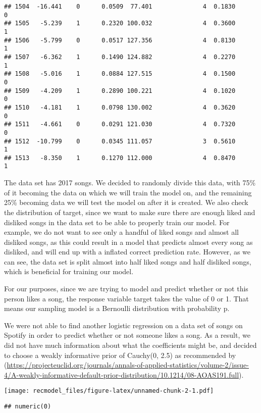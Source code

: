 \documentclass[
]{article}
\begin{document}
\begin{verbatim}
## 1504  -16.441    0      0.0509  77.401              4  0.1830      0
## 1505   -5.239    1      0.2320 100.032              4  0.3600      1
## 1506   -5.799    0      0.0517 127.356              4  0.8130      1
## 1507   -6.362    1      0.1490 124.882              4  0.2270      1
## 1508   -5.016    1      0.0884 127.515              4  0.1500      0
## 1509   -4.209    1      0.2890 100.221              4  0.1020      0
## 1510   -4.181    1      0.0798 130.002              4  0.3620      0
## 1511   -4.661    0      0.0291 121.030              4  0.7320      0
## 1512  -10.799    0      0.0345 111.057              3  0.5610      1
## 1513   -8.350    1      0.1270 112.000              4  0.8470      1
\end{verbatim}

The data set has 2017 songs. We decided to randomly divide this data,
with 75\% of it becoming the data on which we will train the model on,
and the remaining 25\% becoming data we will test the model on after it
is created. We also check the distribution of target, since we want to
make sure there are enough liked and disliked songs in the data set to
be able to properly train our model. For example, we do not want to see
only a handful of liked songs and almost all disliked songs, as this
could result in a model that predicts almost every song as disliked, and
will end up with a inflated correct prediction rate. However, as we can
see, the data set is split almost into half liked songs and half
disliked songs, which is beneficial for training our model.

For our purposes, since we are trying to model and predict whether or
not this person likes a song, the response variable target takes the
value of 0 or 1. That means our sampling model is a Bernoulli
distribution with probability p.~

We were not able to find another logistic regression on a data set of
songs on Spotify in order to predict whether or not someone likes a
song. As a result, we did not have much information about what the
coefficients might be, and decided to choose a weakly informative prior
of Cauchy(0, 2.5) as recommended by
(\url{https://projecteuclid.org/journals/annals-of-applied-statistics/volume-2/issue-4/A-weakly-informative-default-prior-distribution/10.1214/08-AOAS191.full}).

\texttt{[image: recmodel\_files/figure-latex/unnamed-chunk-2-1.pdf]}

\begin{verbatim}
## numeric(0)
\end{verbatim}
\end{document}
